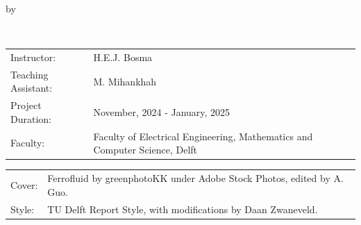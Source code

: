 \begin{titlepage}

\begin{center}

{\makeatletter
\largetitlestyle\fontsize{45}{45}\selectfont\@title
\makeatother}

{\makeatletter
\ifdefvoid{\@subtitle}{}{\bigskip\titlestyle\fontsize{20}{20}\selectfont\@subtitle}
\makeatother}

\bigskip
\bigskip

by

\bigskip
\bigskip

{\makeatletter
\largetitlestyle\fontsize{25}{25}\selectfont\@author\\
\makeatother}

\bigskip
\bigskip

\setlength\extrarowheight{2pt}

\vfill

\begin{tabular}{ll}
    Instructor: & H.E.J. Bosma \\
    Teaching Assistant: & M. Mihankhah \\
    Project Duration: & November, 2024 - January, 2025 \\
    Faculty: & Faculty of Electrical Engineering, Mathematics and Computer Science, Delft
\end{tabular}

\bigskip
\bigskip

\begin{tabular}{p{15mm}p{10cm}}
    Cover: & Ferrofluid by greenphotoKK under Adobe Stock Photos, edited by A. Guo.\\
    Style: & TU Delft Report Style, with modifications by Daan Zwaneveld.
\end{tabular}

\end{center}


\end{titlepage}
